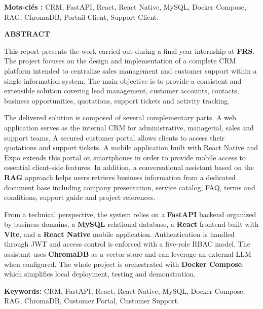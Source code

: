 \textbf{Mots-clés :} CRM, FastAPI, React, React Native, MySQL, Docker Compose, RAG, ChromaDB, Portail Client, Support Client.\par

\vspace{1.5cm}

\begin{center}
{\Large \textbf{ABSTRACT}}
\end{center}
\vspace{0.5cm}

This report presents the work carried out during a final-year internship at \textbf{FRS}. The project focuses on the design and implementation of a complete CRM platform intended to centralize sales management and customer support within a single information system. The main objective is to provide a consistent and extensible solution covering lead management, customer accounts, contacts, business opportunities, quotations, support tickets and activity tracking.\par
\vspace{0.3cm}

The delivered solution is composed of several complementary parts. A web application serves as the internal CRM for administrative, managerial, sales and support teams. A secured customer portal allows clients to access their quotations and support tickets. A mobile application built with React Native and Expo extends this portal on smartphones in order to provide mobile access to essential client-side features. In addition, a conversational assistant based on the \textbf{RAG} approach helps users retrieve business information from a dedicated document base including company presentation, service catalog, FAQ, terms and conditions, support guide and project references.\par
\vspace{0.3cm}

From a technical perspective, the system relies on a \textbf{FastAPI} backend organized by business domains, a \textbf{MySQL} relational database, a \textbf{React} frontend built with \textbf{Vite}, and a \textbf{React Native} mobile application. Authentication is handled through JWT and access control is enforced with a five-role RBAC model. The assistant uses \textbf{ChromaDB} as a vector store and can leverage an external LLM when configured. The whole project is orchestrated with \textbf{Docker Compose}, which simplifies local deployment, testing and demonstration.\par
\vspace{0.3cm}

\textbf{Keywords:} CRM, FastAPI, React, React Native, MySQL, Docker Compose, RAG, ChromaDB, Customer Portal, Customer Support.\par
